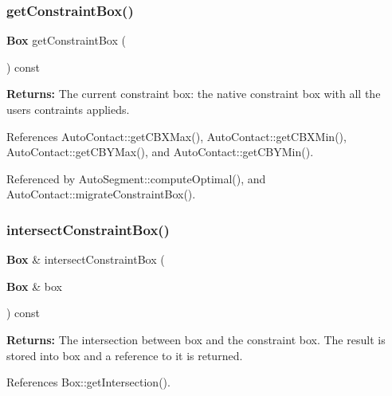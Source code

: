 \subsubsection{\texorpdfstring{get\+Constraint\+Box()}{getConstraintBox()}}
{\footnotesize\ttfamily \textbf{ Box} get\+Constraint\+Box (\begin{DoxyParamCaption}{ }\end{DoxyParamCaption}) const\hspace{0.3cm}{\ttfamily [inline]}}

{\bfseries Returns\+:} The current constraint box\+: the native constraint box with all the user\textquotesingle{}s contraints applieds. 

References Auto\+Contact\+::get\+C\+B\+X\+Max(), Auto\+Contact\+::get\+C\+B\+X\+Min(), Auto\+Contact\+::get\+C\+B\+Y\+Max(), and Auto\+Contact\+::get\+C\+B\+Y\+Min().



Referenced by Auto\+Segment\+::compute\+Optimal(), and Auto\+Contact\+::migrate\+Constraint\+Box().

\mbox{\label{classKatabatic_1_1AutoContact_ac2fe070a286356a24baa466b4fe5b74d}} 
\subsubsection{\texorpdfstring{intersect\+Constraint\+Box()}{intersectConstraintBox()}}
{\footnotesize\ttfamily \textbf{ Box} \& intersect\+Constraint\+Box (\begin{DoxyParamCaption}\item[{\textbf{ Box} \&}]{box }\end{DoxyParamCaption}) const}

{\bfseries Returns\+:} The intersection between {\ttfamily box} and the constraint box. The result is stored into {\ttfamily box} and a reference to it is returned. 

References Box\+::get\+Intersection().

\mbox{\label{classKatabatic_1_1AutoContact_aabac50fd9b8e1bba7289573973658d18}} 
